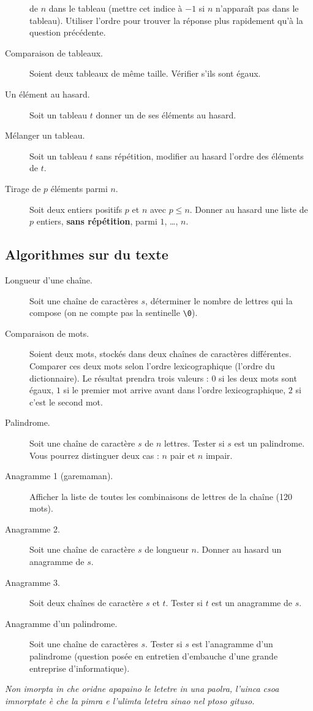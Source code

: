 \begin{description}
  de $n$ dans le tableau (mettre cet
  indice à $-1$ si $n$ n'apparaît pas dans le tableau). Utiliser l'ordre
  pour trouver la réponse plus rapidement qu'à la question précédente.
\item[Comparaison de tableaux.] Soient deux tableaux de même
  taille. Vérifier s'ils sont égaux.
\item[Un élément au hasard.] Soit un tableau $t$ donner un de ses
  éléments au hasard.
\item[Mélanger un tableau.] Soit un tableau $t$ sans
  répétition, modifier au hasard l'ordre des éléments de $t$.
\item[Tirage de $p$ éléments parmi $n$.] Soit deux entiers positifs $p$ et $n$
  avec $p \leq n$. Donner au hasard une liste de $p$ entiers, \textbf{sans répétition}, parmi
  $1$, \ldots, $n$.
\end{description}
\subsection{Algorithmes sur du texte}
\begin{description}
\item[Longueur d'une chaîne.] Soit une chaîne de caractères $s$,
  déterminer le nombre de lettres qui la compose (on ne compte pas la
  sentinelle \verb|\0|).
\item[Comparaison de mots.] Soient deux mots, stockés dans deux
  chaînes de caractères différentes.  Comparer ces deux mots selon
  l'ordre lexicographique (l'ordre du dictionnaire). Le résultat
  prendra trois valeurs : $0$ si les deux mots sont égaux, $1$  si le
  premier mot arrive avant dans l'ordre lexicographique, $2$ si c'est
  le second mot.
  \item[Palindrome.] Soit une chaîne de caractère $s$ de $n$ lettres. Tester si $s$
    est un palindrome. Vous pourrez distinguer deux cas : $n$ pair
    et $n$ impair.
\item[Anagramme 1 (garemaman).] Afficher la liste
  de toutes les combinaisons de lettres de la chaîne  (120 mots).
\item[Anagramme 2.] Soit une chaîne de caractère $s$ de longueur
  $n$. Donner au hasard un anagramme de $s$.
\item[Anagramme 3.] Soit deux chaînes de caractère $s$ et $t$. Tester
  si $t$ est un anagramme de $s$.
\item[Anagramme d'un palindrome.] Soit une chaîne de caractères
  $s$. Tester si $s$ est l'anagramme d'un palindrome (question posée
  en entretien d'embauche d'une grande entreprise d'informatique).
\end{description}

\emph{Non imorpta in che oridne apapaino le letetre in una paolra, l'uinca csoa imnorptate è che la pimra e l'ulimta letetra sinao nel ptoso gituso.}


